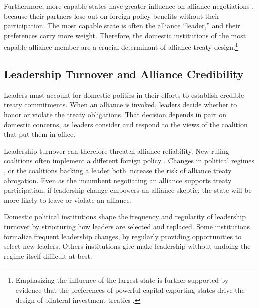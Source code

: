 \documentclass[12pt]{article}
\begin{document}
Furthermore, more capable states have greater influence on alliance negotiations \citep{Mattes2012}, because their partners lose out on foreign policy benefits without their participation.
The most capable state is often the alliance ``leader,'' and their preferences carry more weight. 
Therefore, the domestic institutions of the most capable alliance member are a crucial determinant of alliance treaty design.\footnote{Emphasizing the influence of the largest state is further supported by evidence that the preferences of powerful capital-exporting states drive the design of bilateral investment treaties \citep{AlleePeinhardt2014}.} 


\subsection{Leadership Turnover and Alliance Credibility}


Leaders must account for domestic politics in their efforts to establish credible treaty commitments.
When an alliance is invoked, leaders decide whether to honor or violate the treaty obligations. 
That decision depends in part on domestic concerns, as leaders consider and respond to the views of the coalition that put them in office. 


Leadership turnover can therefore threaten alliance reliability.
New ruling coalitions often implement a different foreign policy \citep{Lobell2004, Narizny2007}.  
Changes in political regimes \citep{LeedsSavun2007}, or the coalitions backing a leader \citep{Leedsetal2009} both increase the risk of alliance treaty abrogation. 
Even as the incumbent negotiating an alliance supports treaty participation, if leadership change empowers an alliance skeptic, the state will be more likely to leave or violate an alliance.  


Domestic political institutions shape the frequency and regularity of leadership turnover by structuring how leaders are selected and replaced. 
Some institutions formalize frequent leadership changes, by regularly providing opportunities to select new leaders. 
Others institutions give make leadership without undoing the regime itself difficult at best. 
\end{document}
